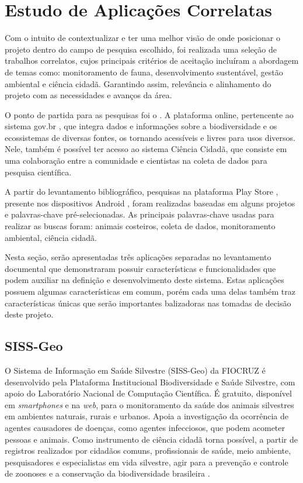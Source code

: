 \chapter{Estudo de Aplicações Correlatas}\label{trabalhos-correlatos}

Com o intuito de contextualizar e ter uma melhor visão de onde posicionar o projeto dentro do campo de pesquisa escolhido, foi realizada uma seleção de trabalhos correlatos, cujos principais critérios de aceitação incluíram a abordagem de temas como: monitoramento de fauna, desenvolvimento sustentável, gestão ambiental e ciência cidadã. Garantindo assim, relevância e alinhamento do projeto com as necessidades e avanços da área.

O ponto de partida para as pesquisas foi o . A plataforma online, pertencente ao sistema gov.br \cite{govbr2024}, que integra dados e informações sobre a biodiversidade e os ecossistemas de diversas fontes, os tornando acessíveis e livres para usos diversos. Nele, também é possível ter acesso ao sistema Ciência Cidadã, que consiste em uma colaboração entre a comunidade e cientistas na coleta de dados para pesquisa científica. 

A partir do levantamento bibliográfico, pesquisas na plataforma Play Store \cite{playstore2024}, presente nos dispositivos Android \cite{android2024}, foram realizadas baseadas em alguns projetos e palavras-chave pré-selecionadas. As principais palavras-chave usadas para realizar as buscas foram: animais costeiros, coleta de dados, monitoramento ambiental, ciência cidadã.

Nesta seção, serão apresentadas três aplicações separadas no levantamento documental que  demonstraram possuir características e funcionalidades que podem auxiliar na definição e desenvolvimento deste sistema. Estas aplicações possuem algumas características em comum, porém cada uma delas também traz características únicas que serão importantes balizadoras nas tomadas de decisão deste projeto.

\section{SISS-Geo}\label{siss-geo}

O Sistema de Informação em Saúde Silvestre (SISS-Geo) da FIOCRUZ é desenvolvido pela Plataforma Institucional Biodiversidade e Saúde Silvestre, com apoio do Laboratório Nacional de Computação Científica. É gratuito, disponível em \textit{smartphones} e na \textit{web}, para o monitoramento da saúde dos animais silvestres em ambientes naturais, rurais e urbanos. Apoia a investigação da ocorrência de agentes causadores de doenças, como agentes infecciosos, que podem acometer pessoas e animais. Como instrumento de ciência cidadã torna possível, a partir de registros realizados por cidadãos comuns, profissionais de saúde, meio ambiente, pesquisadores e especialistas em vida silvestre, agir para a prevenção e controle de zoonoses e a conservação da biodiversidade brasileira \cite{chame2015sissgeo}.

